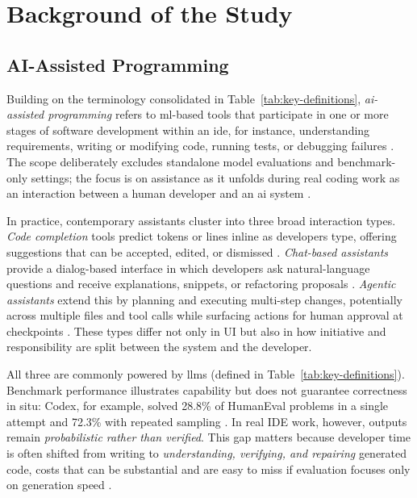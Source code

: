 \chapter{Background of the Study}
\label{chap:background}

\section{AI-Assisted Programming}
\label{sec:bg-ai}

Building on the terminology consolidated in Table~\ref{tab:key-definitions}, \emph{\gls{ai}-assisted programming} refers to \gls{ml}-based tools that participate in one or more stages of software development within an \gls{ide}, for instance, understanding requirements, writing or modifying code, running tests, or debugging failures \parencite{ziegler2024measuring, chen2021codex}. The scope deliberately excludes standalone model evaluations and benchmark-only settings; the focus is on assistance as it unfolds during real coding work as an interaction between a human developer and an \gls{ai} system \parencite{ziegler2024measuring}.

In practice, contemporary assistants cluster into three broad interaction types. \emph{Code completion} tools predict tokens or lines inline as developers type, offering suggestions that can be accepted, edited, or dismissed \parencite[pp.~2--3]{chen2021codex}. \emph{Chat-based assistants} provide a dialog-based interface in which developers ask natural-language questions and receive explanations, snippets, or refactoring proposals \parencite[p.~492]{ross2023programmer}. \emph{Agentic assistants} extend this by planning and executing multi-step changes, potentially across multiple files and tool calls while surfacing actions for human approval at checkpoints \parencite{vscodeCopilotAgentMode}. These types differ not only in UI but also in how initiative and responsibility are split between the system and the developer.

All three are commonly powered by \glspl{llm} (defined in Table~\ref{tab:key-definitions}). Benchmark performance illustrates capability but does not guarantee correctness in situ: Codex, for example, solved 28.8\% of HumanEval problems in a single attempt and 72.3\% with repeated sampling \parencite[p.~1]{chen2021codex}. In real IDE work, however, outputs remain \emph{probabilistic rather than verified}. This gap matters because developer time is often shifted from writing to \emph{understanding, verifying, and repairing} generated code, costs that can be substantial and are easy to miss if evaluation focuses only on generation speed \parencite{vaithilingam2022expectation, mozannar2024reading}.

